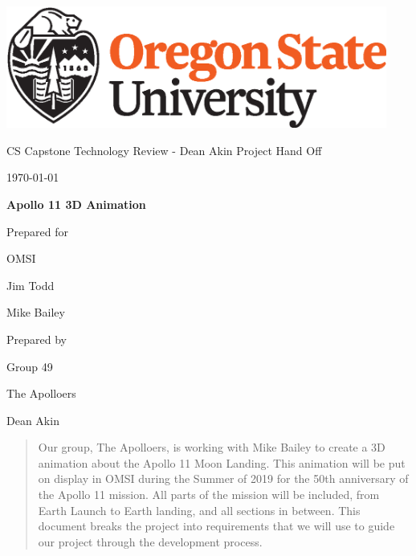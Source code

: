 \documentclass[onecolumn, draftclsnofoot,10pt, compsoc]{IEEEtran}
\def \CapstoneTeamName{		    The Apolloers}
\def \CapstoneTeamNumber{		49}
\def \GroupMemberThree{			Dean Akin}
\def \CapstoneProjectName{		Apollo 11 3D Animation}
\def \CapstoneSponsorCompany{	OMSI}
\def \CapstoneSponsorPersona{	Jim Todd}
\def \CapstoneSponsorPersonb{	Mike Bailey}
\def \DocType{		
				Project Hand Off
				}
\newcommand{\NameSigPair}[1]{\par
\makebox[2.75in][r]{#1} \hfil 	\makebox[3.25in]{\makebox[2.25in]{\hrulefill} \hfill		\makebox[.75in]{\hrulefill}}
\par\vspace{-12pt} \textit{\tiny\noindent
\makebox[2.75in]{} \hfil		\makebox[3.25in]{\makebox[2.25in][r]{Signature} \hfill	\makebox[.75in][r]{Date}}}}
\renewcommand{\NameSigPair}[1]{#1}
\begin{document}
\begin{titlepage}
    \begin{singlespace}
        \hfill 
        \includegraphics[height=4cm]{OSU_horizontal_2C_O_over_B.eps}   
        \par\vspace{.2in}
        \centering
        \scshape{
            \huge CS Capstone Technology Review - Dean Akin \DocType \par
            {\large\today}\par
            \vspace{.5in}
            \textbf{\Huge\CapstoneProjectName}\par
            \vfill
            {\large Prepared for}\par
            \Huge \CapstoneSponsorCompany\par
            \vspace{5pt}
            {\Large\NameSigPair{\CapstoneSponsorPersona}\par}
            {\Large\NameSigPair{\CapstoneSponsorPersonb}\par}
            {\large Prepared by }\par
            Group\CapstoneTeamNumber\par
            \CapstoneTeamName\par 
            \vspace{5pt}
            {\Large
                \NameSigPair{\GroupMemberThree}\par
            }
            \vspace{20pt}
        }
        \begin{abstract}
        	Our group, The Apolloers, is working with Mike Bailey to create a 3D animation about the Apollo 11 Moon Landing. This animation will be put on display in OMSI during the Summer of 2019 for the 50th anniversary of the Apollo 11 mission. All parts of the mission will be included, from Earth Launch to Earth landing, and all sections in between. This document breaks the project into requirements that we will use to guide our project through the development process. 
        \end{abstract}     
    \end{singlespace}
\end{titlepage}
\newpage
{}
\clearpage
\end{document}
